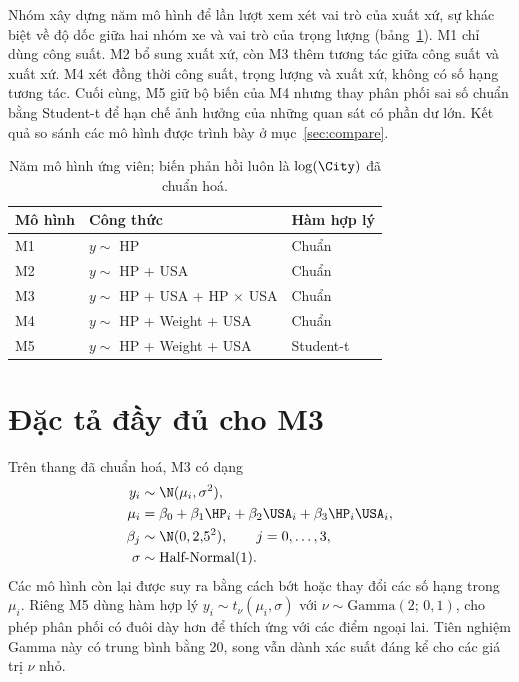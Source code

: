 \documentclass[12pt,a4paper]{report}
\begin{document}
Nhóm xây dựng năm mô hình để lần lượt xem xét vai trò của xuất xứ, sự khác
biệt về độ dốc giữa hai nhóm xe và vai trò của trọng lượng
(bảng~\ref{tab:models}). M1 chỉ dùng công suất. M2 bổ sung xuất xứ, còn M3 thêm
tương tác giữa công suất và xuất xứ. M4 xét đồng thời công suất, trọng lượng và
xuất xứ, không có số hạng tương tác. Cuối cùng, M5 giữ bộ biến của M4 nhưng
thay phân phối sai số chuẩn bằng Student-t để hạn chế ảnh hưởng của những quan
sát có phần dư lớn. Kết quả so sánh các mô hình được trình bày ở
mục~\ref{sec:compare}.

\begin{table}[tp]
  \centering
  \caption{Năm mô hình ứng viên; biến phản hồi luôn là $\log(\City)$ đã chuẩn
    hoá.}
  \label{tab:models}
  \begin{tabular}{lll}
    \toprule
    Mô hình & Công thức & Hàm hợp lý \\
    \midrule
    M1 & $y \sim$ HP                        & Chuẩn \\
    M2 & $y \sim$ HP + USA                  & Chuẩn \\
    M3 & $y \sim$ HP + USA + HP $\times$ USA & Chuẩn \\
    M4 & $y \sim$ HP + Weight + USA         & Chuẩn \\
    M5 & $y \sim$ HP + Weight + USA         & Student-t \\
    \bottomrule
  \end{tabular}
\end{table}

\section{Đặc tả đầy đủ cho M3}

Trên thang đã chuẩn hoá, M3 có dạng
%
\begin{equation}
  \label{eq:m3}
  \begin{aligned}
    y_i &\sim \N(\mu_i, \sigma^2), \\
    \mu_i &= \beta_0 + \beta_1 \HP_i + \beta_2 \USA_i + \beta_3 \HP_i \USA_i, \\
    \beta_j &\sim \N(0, 2{,}5^2), \qquad j = 0, \dots, 3, \\
    \sigma &\sim \text{Half-Normal}(1).
  \end{aligned}
\end{equation}
%
Các mô hình còn lại được suy ra bằng cách bớt hoặc thay đổi các số hạng trong
$\mu_i$. Riêng M5 dùng hàm hợp lý $y_i \sim t_\nu(\mu_i, \sigma)$ với
$\nu \sim \text{Gamma}(2;\, 0{,}1)$, cho phép phân phối có đuôi dày hơn để thích
ứng với các điểm ngoại lai. Tiên nghiệm Gamma này có trung bình bằng 20, song
vẫn dành xác suất đáng kể cho các giá trị $\nu$ nhỏ.
\end{document}
